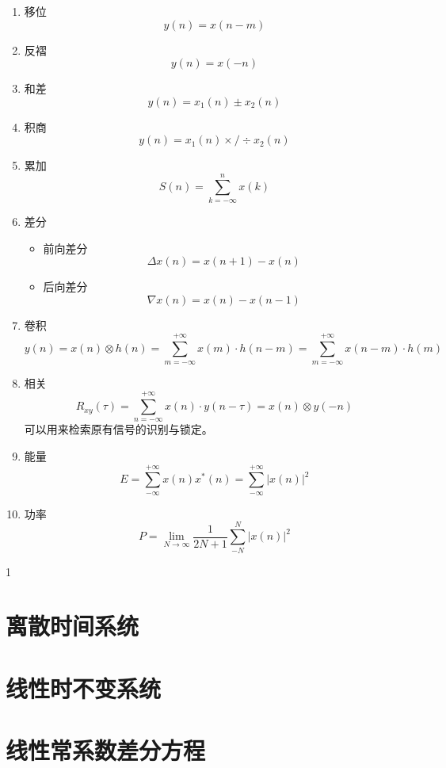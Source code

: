 \documentclass[cn,11pt,chinese,black,simple]{../elegantbook}
\begin{document}
\begin{enumerate}
    \item 移位 \[y(n) = x(n-m)\]
    \item 反褶 \[y(n) = x(-n)\]
    \item 和差 \[y(n) = x_1(n) \pm x_2(n)\]
    \item 积商 \[y(n) = x_1(n) \times / \div x_2(n)\]
    \item 累加 \[S(n) = \sum_{k=-\infty}^n x(k)\]
    \item 差分 \begin{itemize}
        \item 前向差分 \[\Delta x(n) = x(n+1) - x(n)\]
        \item 后向差分 \[\nabla x(n) = x(n) - x(n-1)\]
    \end{itemize}
    \item 卷积 \[y(n) = x(n) \otimes h(n) = \sum_{m=-\infty}^{+\infty}x(m)\cdot h(n-m) = \sum_{m=-\infty}^{+\infty}x(n-m)\cdot h(m)\]
    \item 相关 \[R_{xy}(\tau) = \sum_{n=-\infty}^{+\infty} x(n) \cdot y(n-\tau) = x(n) \otimes y(-n)\]
    可以用来检索原有信号的识别与锁定。
    \item 能量 \[E = \sum_{-\infty}^{+\infty} x(n) x^*(n) = \sum_{-\infty}^{+\infty} |x(n)|^2\]
    \item 功率 \[P = \lim_{N\rightarrow \infty} \frac{1}{2 N + 1} \sum_{-N}^N |x(n)|^2\]
\end{enumerate}1



\section{离散时间系统}

\section{线性时不变系统}

\section{线性常系数差分方程}

\let\chapname\undefined
\ifx\mainclass\undefined
\end{document}

